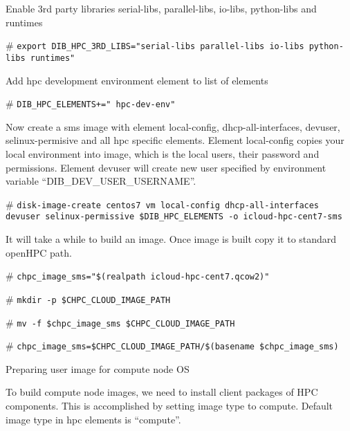 \documentclass[12pt]{article}
\begin{document}
Enable 3rd party libraries serial-libs, parallel-libs, io-libs, python-libs and runtimes

\begin{bash}[ctrlr]\# \texttt{\small{export DIB\_HPC\_3RD\_LIBS="serial-libs parallel-libs io-libs python-libs runtimes"}}\end{bash}

Add hpc development environment element to list of elements

\begin{bash}[ctrlr]\# \texttt{\small{DIB\_HPC\_ELEMENTS+=" hpc-dev-env"}}\end{bash}

Now create a sms image with element local-config, dhcp-all-interfaces, devuser, selinux-permisive and all hpc specific elements. Element local-config copies your local environment into image, which is the local users, their password and permissions. Element devuser will create new user specified by environment variable “DIB\_DEV\_USER\_USERNAME”. 

\begin{bash}[ctrlr]\# \texttt{\small{disk-image-create centos7 vm local-config dhcp-all-interfaces devuser selinux-permissive \$DIB\_HPC\_ELEMENTS -o icloud-hpc-cent7-sms}}\end{bash}

It will take a while to build an image. Once image is built copy it to standard openHPC path.

\begin{bash}[ctrlr]\# \texttt{\small{chpc\_image\_sms="\$(realpath icloud-hpc-cent7.qcow2)"}}\end{bash}
\begin{bash}[ctrlr]\# \texttt{\small{mkdir -p \$CHPC\_CLOUD\_IMAGE\_PATH}}\end{bash}
\begin{bash}[ctrlr]\# \texttt{\small{mv -f \$chpc\_image\_sms \$CHPC\_CLOUD\_IMAGE\_PATH}}\end{bash}
\begin{bash}[ctrlr]\# \texttt{\small{chpc\_image\_sms=\$CHPC\_CLOUD\_IMAGE\_PATH/\$(basename \$chpc\_image\_sms)}}\end{bash}

Preparing user image for compute node OS

To build compute node images, we need to install client packages of HPC components. This is accomplished by setting image type to compute. Default image type in hpc elements is “compute”.
\end{document}
